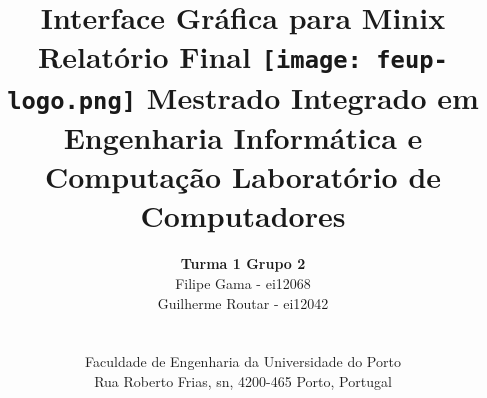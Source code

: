 \documentclass[a4paper]{article}
\begin{document}
\setlength{\textwidth}{16cm}
\setlength{\textheight}{22cm}
\lstset{language=Prolog}

\title{\Huge\textbf{Interface Gráfica para Minix }\linebreak\linebreak\linebreak
\Large\textbf{Relatório Final}\linebreak\linebreak
\linebreak\linebreak
\texttt{[image: feup-logo.png]}\linebreak\linebreak
\linebreak\linebreak
\Large{Mestrado Integrado em Engenharia Informática e Computação} \linebreak\linebreak
\Large{Laboratório de Computadores}\linebreak
}

\author{\textbf{Turma 1 Grupo 2}\\
Filipe Gama - ei12068 \\
Guilherme Routar - ei12042 \\
\linebreak\linebreak \\
 \\ Faculdade de Engenharia da Universidade do Porto \\ Rua Roberto Frias, s\/n, 4200-465 Porto, Portugal \linebreak\linebreak\linebreak
\linebreak\linebreak\vspace{1cm}}

\maketitle
\thispagestyle{empty}


\newpage
\end{document}
